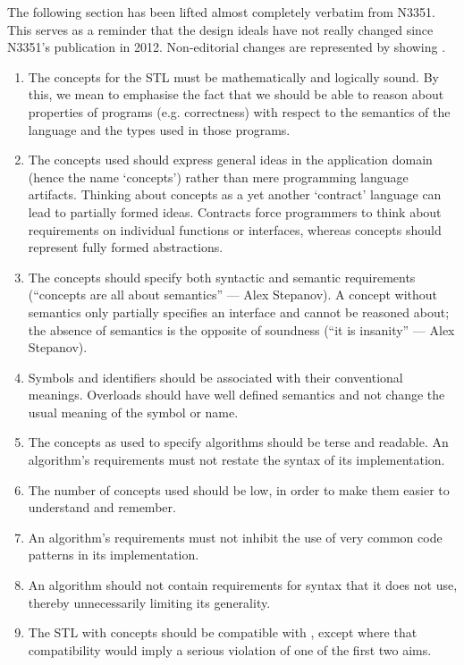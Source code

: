 The following section has been lifted almost completely verbatim from N3351. This serves as a
reminder that the design ideals have not really changed since N3351's publication in 2012.
Non-editorial changes are represented by showing .
\begin{enumerate}
   \item The concepts for the STL must be mathematically and logically sound. By this, we mean to
         emphasise the fact that we should be able to reason about properties of programs (e.g.
         correctness) with respect to the semantics of the language and the types used in those
         programs.
   \item The concepts used should express general ideas in the application domain (hence the name
         `concepts') rather than mere programming language artifacts. Thinking about concepts as a
         yet another `contract' language can lead to partially formed ideas. Contracts force
         programmers to think about requirements on individual functions or interfaces, whereas
         concepts should represent fully formed abstractions.
   \item The concepts should specify both syntactic and semantic requirements (``concepts are all
         about semantics'' --- Alex Stepanov). A concept without semantics only partially specifies
         an interface and cannot be reasoned about; the absence of semantics is the opposite of
         soundness (``it is insanity'' --- Alex Stepanov).
   \item Symbols and identifiers should be associated with their conventional meanings. Overloads
         should have well defined semantics and not change the usual meaning of the symbol or name.
   \item The concepts as used to specify algorithms should be terse and readable. An algorithm's
         requirements must not restate the syntax of its implementation.
   \item The number of concepts used should be low, in order to make them easier to understand and
         remember.
   \item An algorithm's requirements must not inhibit the use of very common code patterns in its
         implementation.
   \item An algorithm should not contain requirements for syntax that it does not use, thereby
         unnecessarily limiting its generality.
   \item The STL with concepts should be compatible with , except where
         that compatibility would imply a serious violation of one of the first two aims.
\end{enumerate}

